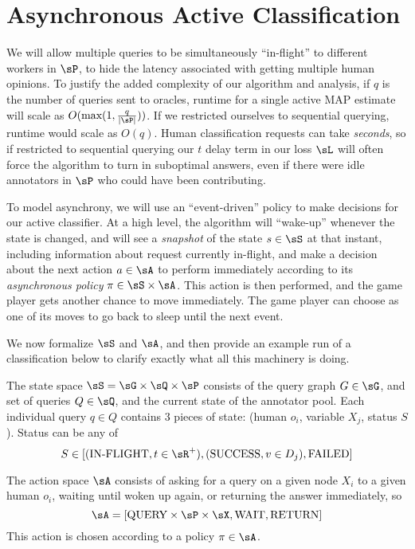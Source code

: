 \section{Asynchronous Active Classification}
\label{sec:async}

We will allow multiple queries to be simultaneously ``in-flight'' to different workers in $\sP$, to hide the latency associated with getting multiple human opinions.
 To justify the added complexity of our algorithm and analysis, if $q$ is the number of queries sent to oracles, runtime for a single active MAP estimate will scale as $O(\text{max}(1, \frac{q}{|\sP|}))$.
 If we restricted ourselves to sequential querying, runtime would scale as $O(q)$.
 Human classification requests can take \textit{seconds}, so if restricted to sequential querying our $t$ delay term in our loss $\sL$ will often force the algorithm to turn in suboptimal answers, even if there were idle annotators in $\sP$ who could have been contributing.

To model asynchrony, we will use an ``event-driven'' policy to make decisions for our active classifier.
 At a high level, the algorithm will ``wake-up'' whenever the state is changed, and will see a \textit{snapshot} of the state $s \in \sS$ at that instant, including information about request currently in-flight, and make a decision about the next action $a \in \sA$ to perform immediately according to its \textit{asynchronous policy} $\pi \in \sS \times \sA$.
 This action is then performed, and the game player gets another chance to move immediately.
 The game player can choose as one of its moves to go back to sleep until the next event.

We now formalize $\sS$ and $\sA$, and then provide an example run of a classification below to clarify exactly what all this machinery is doing.


The state space $\sS = \sG \times \sQ \times \sP$ consists of the query graph $G \in \sG$, and set of queries $Q \in \sQ$, and the current state of the annotator pool.
 Each individual query $q \in Q$ contains 3 pieces of state: (human $o_i$, variable $X_j$, status $S$).
 Status can be any of 
\[S \in [(\text{IN-FLIGHT}, t \in \sR^+), (\text{SUCCESS}, v \in D_j), \text{FAILED}]\]

The action space $\sA$ consists of asking for a query on a given node $X_i$ to a given human $o_i$, waiting until woken up again, or returning the answer immediately, so 
\[\sA = [\text{QUERY} \times \sP \times \sX , \text{WAIT}, \text{RETURN}]\]
This action is chosen according to a policy $\pi \in \sA$.

